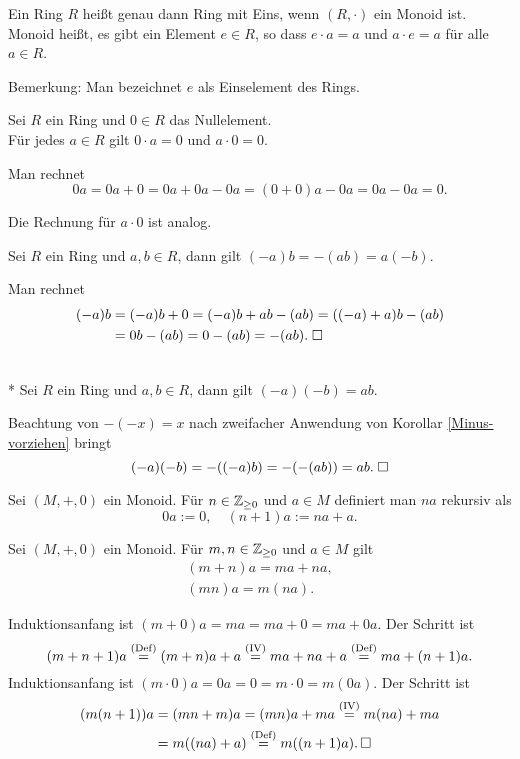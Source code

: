 \begin{Definition}
Ein Ring $R$ heißt genau dann Ring mit Eins, wenn $(R,\cdot)$ ein
Monoid ist. Monoid heißt, es gibt ein Element $e\in R$, so dass
$e\cdot a = a$ und $a\cdot e = a$ für alle $a\in R$.
\end{Definition}
Bemerkung: Man bezeichnet $e$ als Einselement des Rings.

\begin{Korollar}
Sei $R$ ein Ring und $0\in R$ das Nullelement.\\
Für jedes $a\in R$ gilt $0\cdot a = 0$ und $a\cdot 0 = 0$.
\end{Korollar}
\begin{Beweis} Man rechnet
\[0a = 0a+0 = 0a+0a-0a = (0+0)a-0a = 0a-0a = 0.\]
\end{Beweis}
Die Rechnung für $a\cdot 0$ ist analog.\;\qedsymbol

\begin{Korollar}\label{Minus-vorziehen}
Sei $R$ ein Ring und $a,b\in R$, dann gilt $(-a)b = -(ab) = a(-b)$.
\end{Korollar}
\begin{Beweis}
Man rechnet
\begin{align*}
(-a)b &= (-a)b+0 = (-a)b+ab-(ab) = ((-a)+a)b-(ab)\\
&= 0b-(ab) = 0-(ab) = -(ab).\;\square
\end{align*}
\end{Beweis}

\begin{Korollar}\mbox{}\\*
Sei $R$ ein Ring und $a,b\in R$, dann gilt
$(-a)(-b) = ab$.
\end{Korollar}
Beachtung von $-(-x)=x$ nach zweifacher Anwendung von
Korollar \ref{Minus-vorziehen} bringt
\[(-a)(-b) = -((-a)b) = -(-(ab)) = ab.\;\square\]

\begin{Definition}
Sei $(M,+,0)$ ein Monoid. Für $n\in\mathbb Z_{\ge 0}$ und $a\in M$ definiert
man $na$ rekursiv als
\[0a := 0,\quad (n+1)a := na + a.\]
\end{Definition}

\begin{Korollar}
Sei $(M,+,0)$ ein Monoid. Für $m,n\in\mathbb Z_{\ge 0}$ und $a\in M$ gilt
\begin{gather}
(m+n)a = ma + na,\\
(mn)a = m(na).
\end{gather}
\end{Korollar}
\begin{Beweis}
Induktionsanfang ist $(m+0)a = ma = ma+0 = ma + 0a$. Der Schritt ist%
\[(m+n+1)a \stackrel{\mathrm{(Def)}}{=} (m+n)a + a
\stackrel{\mathrm{(IV)}}{=} ma+na + a
\stackrel{\mathrm{(Def)}}{=} ma + (n+1)a.\]
Induktionsanfang ist $(m\cdot 0)a = 0a = 0 = m\cdot 0 = m(0a)$.
Der Schritt ist
\begin{align*}
(m(n+1))a &= (mn+m)a = (mn)a+ma \stackrel{\mathrm{(IV)}}{=} m(na)+ma\\
&= m((na)+a) \stackrel{\mathrm{(Def)}}{=}
m((n+1)a).\,\square
\end{align*}
\end{Beweis}

